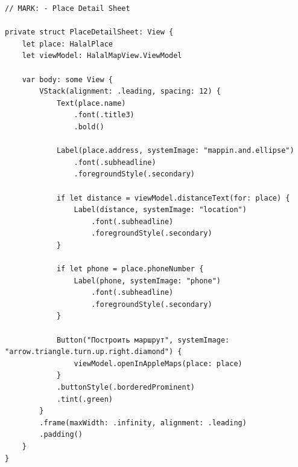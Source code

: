 \begin{lstlisting}[basicstyle=\tiny\ttfamily,breaklines=true]
// MARK: - Place Detail Sheet

private struct PlaceDetailSheet: View {
    let place: HalalPlace
    let viewModel: HalalMapView.ViewModel

    var body: some View {
        VStack(alignment: .leading, spacing: 12) {
            Text(place.name)
                .font(.title3)
                .bold()

            Label(place.address, systemImage: "mappin.and.ellipse")
                .font(.subheadline)
                .foregroundStyle(.secondary)

            if let distance = viewModel.distanceText(for: place) {
                Label(distance, systemImage: "location")
                    .font(.subheadline)
                    .foregroundStyle(.secondary)
            }

            if let phone = place.phoneNumber {
                Label(phone, systemImage: "phone")
                    .font(.subheadline)
                    .foregroundStyle(.secondary)
            }

            Button("Построить маршрут", systemImage: "arrow.triangle.turn.up.right.diamond") {
                viewModel.openInAppleMaps(place: place)
            }
            .buttonStyle(.borderedProminent)
            .tint(.green)
        }
        .frame(maxWidth: .infinity, alignment: .leading)
        .padding()
    }
}
\end{lstlisting}

